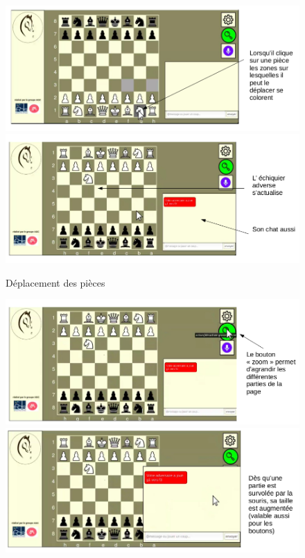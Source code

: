 \documentclass[12pt, openany]{report}
\begin{document}
\begin{center}
                \begin{figure}
                   \centering \includegraphics[width=12cm]{UseCase/Jeu1/Game2.png}
                   \includegraphics[width=12cm]{UseCase/Jeu1/Game3.png}
                    \caption{Déplacement des pièces}
                \end{figure}
                \begin{figure}
                   \centering \includegraphics[width=12cm]{UseCase/Jeu1/Game4.png}
                   \includegraphics[width=12cm]{UseCase/Jeu1/Game5.png}

\end{figure}
\end{center}
\end{document}
